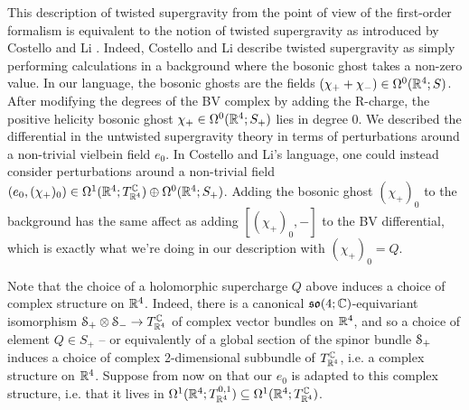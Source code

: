 \documentclass[10pt, oneside]{article}
\begin{document}
\begin{remark}
This description of twisted supergravity from the point of view of the first-order formalism is equivalent to the notion of twisted supergravity as introduced by Costello and Li \cite{CostelloLi}.  Indeed, Costello and Li describe twisted supergravity as simply performing calculations in a background where the bosonic ghost takes a non-zero value.  In our language, the bosonic ghosts are the fields $(\chi_+ + \chi_-) \in \Omega^0(\mathbb{R}^4;S)$.  After modifying the degrees of the BV complex by adding the R-charge, the positive helicity bosonic ghost $\chi_+ \in \Omega^0(\mathbb{R}^4;S_+)$ lies in degree 0.  We described the differential in the untwisted supergravity theory in terms of perturbations around a non-trivial vielbein field $e_0$.  In Costello and Li's language, one could instead consider perturbations around a non-trivial field $(e_0, (\chi_+)_0) \in \Omega^1(\mathbb{R}^4; T^{\mathbb{C}}_{\mathbb{R}^4}) \oplus \Omega^0(\mathbb{R}^4; S_+)$.  Adding the bosonic ghost $(\chi_+)_0$ to the background has the same affect as adding $[(\chi_+)_0, -]$ to the BV differential, which is exactly what we're doing in our description with $(\chi_+)_0 = Q$.
\end{remark}

Note that the choice of a holomorphic supercharge $Q$ above induces a choice of complex structure on $\mathbb{R}^4$.  Indeed, there is a canonical $\mathfrak{so}(4;\mathbb{C})$-equivariant isomorphism $\mathcal{S}_+ \otimes \mathcal{S}_- \to T^{\mathbb{C}}_{\mathbb{R}^4}$ of complex vector bundles on $\mathbb{R}^4$, and so a choice of element $Q \in S_+$ -- or equivalently of a global section of the spinor bundle $\mathcal{S}_+$ induces a choice of complex 2-dimensional subbundle of $T^{\mathbb{C}}_{\mathbb{R}^4}$, i.e. a complex structure on $\mathbb{R}^4$.  Suppose from now on that our $e_0$ is adapted to this complex structure, i.e. that it lives in $\Omega^1(\mathbb{R}^4; T^{0,1}_{\mathbb{R}^4}) \subseteq \Omega^1(\mathbb{R}^4; T^{\mathbb{C}}_{\mathbb{R}^4})$.
\end{document}
